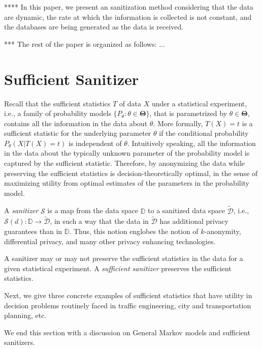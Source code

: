\documentclass{llncs}
\begin{document}
**** In this paper, we present an sanitization method considering that the data are dynamic, the rate at which the information is collected is not constant, and the databases are being generated as the data is received.

*** The rest of the paper is organized as follows: ...

\section{Sufficient Sanitizer}\label{S:SufficientSanitizer}

Recall that the sufficient statistics $T$ of data $X$ under a statistical experiment, i.e., a family of probability models $\{P_{\theta}: \theta \in \mathbf{\Theta}\}$, that is parametrized by $\theta \in \mathbf{\Theta}$, contains all the information in the data about $\theta$.  
More formally, $T(X)=t$ is a sufficient statistic for the underlying parameter $\theta$ if the conditional probability $P_{\theta}(X | T(X)=t)$ is independent of $\theta$.  
Intuitively speaking, all the information in the data about the typically unknown parameter of the probability model is captured by the sufficient statistic.  
Therefore, by anonymizing the data while preserving the sufficient statistics is decision-theoretically optimal, in the sense of maximizing utility from optimal estimates of the parameters in the probability model.

A {\em sanitizer} $\mathcal{S}$ is a map from the data space $\mathbb{D}$ to a sanitized data space $\tilde{\mathcal{D}}$, i.e., $\mathcal{S}(d): \mathbb{D} \to \tilde{\mathcal{D}}$, in such a way that the data in $\tilde{\mathcal{D}}$ has additional privacy guarantees than in $\mathbb{D}$.
Thus, this notion englobes the notion of $k$-anonymity, differential privacy, and many other privacy enhancing technologies.

A sanitizer may or may not preserve the sufficient statistics in the data for a given statistical experiment.
A {\em sufficient sanitizer} preserves the sufficient statistics. 

Next, we give three concrete examples of sufficient statistics that have utility in decision problems routinely faced in traffic engineering, city and transportation planning, etc.

We end this section with a discussion on General Markov models and sufficient sanitizers.
\end{document}
